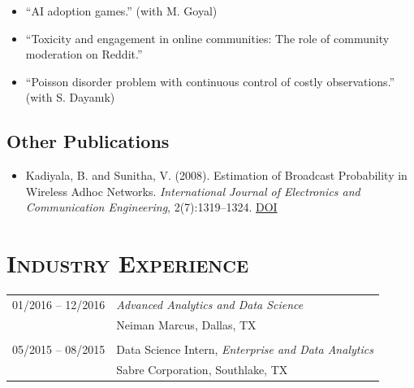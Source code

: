 \documentclass[11pt]{article}
\begin{document}
	\begin{itemize}
		\item  ``AI adoption games.'' (with M. Goyal)
		\item ``Toxicity and engagement in online communities: The role of community moderation on Reddit.''
		\item ``Poisson disorder problem with continuous control of costly observations.'' (with S. Dayan{\i}k)
	\end{itemize}


	\subsection*{Other Publications}

	\begin{itemize}
		\item Kadiyala, B. and Sunitha, V. (2008). Estimation of Broadcast Probability in Wireless Adhoc Networks. \textit{International Journal of Electronics and Communication Engineering}, 2(7):1319--1324. \href{https://publications.waset.org/3575/estimation-of-broadcast-probability-in-wireless-adhoc-networks}{DOI}
	\end{itemize}



	\section*{\textbf{\textsc{Industry Experience}}}
	\begin{tabular}{p{3.5cm}p{12cm}}
		01/2016 -- 12/2016  & \textit{Advanced Analytics and Data Science}\\
		&  Neiman Marcus, Dallas, TX \\
		&\\
		05/2015 -- 08/2015  & Data Science Intern, \textit{Enterprise and Data Analytics} \\
		& Sabre Corporation, Southlake, TX
	\end{tabular}
\end{document}
